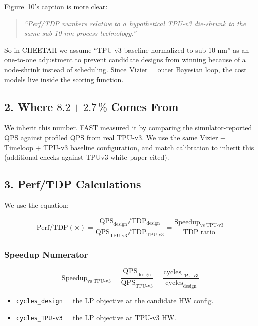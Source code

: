\documentclass[11pt,a4paper]{article}
\newcommand{\ic}[1]{\texttt{#1}}
\begin{document}
Figure~10's caption is  more clear:

\begin{quote}
\textit{``Perf/TDP numbers relative to a hypothetical TPU-v3 die-shrunk to the
same sub-10-nm process technology.''}
\end{quote}

So in CHEETAH we assume ``TPU-v3 baseline normalized to sub-10-nm'' as an one-to-one adjustment to prevent candidate designs from winning because of a node-shrink instead of scheduling. Since Vizier = outer Bayesian loop, the cost models live inside the scoring function. 
\subsection{2. Where $8.2 \pm 2.7\,\%$ Comes From}

We inherit this number. FAST measured it by comparing the
simulator-reported QPS against profiled QPS from real TPU-v3. We use
the same Vizier + Timeloop + TPU-v3 baseline configuration, and match calibration to inherit this (additional checks against TPUv3 white paper cited).

\subsection{3. Perf/TDP Calculations}

We use the equation:

\begin{equation}
\text{Perf/TDP}(\times)
= \frac{\text{QPS}_{\text{design}} / \text{TDP}_{\text{design}}}
       {\text{QPS}_{\text{TPU-v3}} / \text{TDP}_{\text{TPU-v3}}}
= \frac{\text{Speedup}_{\text{vs TPU-v3}}}{\text{TDP ratio}}
\end{equation}

\subsubsection*{Speedup Numerator}

\begin{equation}
\text{Speedup}_{\text{vs TPU-v3}}
= \frac{\text{QPS}_{\text{design}}}{\text{QPS}_{\text{TPU-v3}}}
= \frac{\text{cycles}_{\text{TPU-v3}}}{\text{cycles}_{\text{design}}}
\end{equation}

\begin{itemize}[noitemsep]
  \item \ic{cycles\_design} = the LP objective at the candidate HW config.
  \item \ic{cycles\_TPU-v3} = the LP objective at TPU-v3 HW.
\end{itemize}
\end{document}

